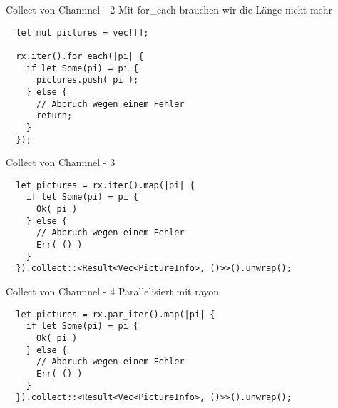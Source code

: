 \documentclass[aspectratio=1610,t]{beamer}
\begin{document}
\begin{frame}[fragile]{Collect von Channnel - 2}
Mit for\_each brauchen wir die Länge nicht mehr
\begin{verbatim}
  let mut pictures = vec![];

  rx.iter().for_each(|pi| {
    if let Some(pi) = pi {
      pictures.push( pi );
    } else {
      // Abbruch wegen einem Fehler
      return;
    }
  });
\end{verbatim}
\end{frame}

\begin{frame}[fragile]{Collect von Channnel - 3}
\begin{verbatim}
  let pictures = rx.iter().map(|pi| {
    if let Some(pi) = pi {
      Ok( pi )
    } else {
      // Abbruch wegen einem Fehler
      Err( () )
    }
  }).collect::<Result<Vec<PictureInfo>, ()>>().unwrap();
\end{verbatim}
\end{frame}

\begin{frame}[fragile]{Collect von Channnel - 4}
Parallelisiert mit rayon
\begin{verbatim}
  let pictures = rx.par_iter().map(|pi| {
    if let Some(pi) = pi {
      Ok( pi )
    } else {
      // Abbruch wegen einem Fehler
      Err( () )
    }
  }).collect::<Result<Vec<PictureInfo>, ()>>().unwrap();
\end{verbatim}
\end{frame}
\end{document}
